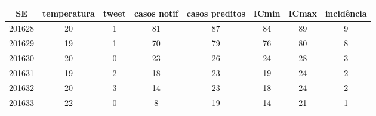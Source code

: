 \begin{tabular}{c|ccccccc}
  \hline
SE & temperatura & tweet & casos notif & casos preditos & ICmin & ICmax & incidência \\ 
  \hline
201628 & 20 & 1 & 81 & 87 & 84 & 89 & 9 \\ 
  201629 & 19 & 1 & 70 & 79 & 76 & 80 & 8 \\ 
  201630 & 20 & 0 & 23 & 26 & 24 & 28 & 3 \\ 
  201631 & 19 & 2 & 18 & 23 & 19 & 24 & 2 \\ 
  201632 & 20 & 3 & 14 & 23 & 18 & 24 & 2 \\ 
  201633 & 22 & 0 & 8 & 19 & 14 & 21 & 1 \\ 
   \hline
\end{tabular}
